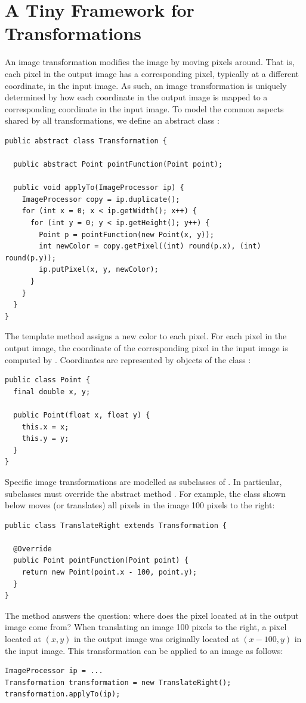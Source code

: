 \documentclass{book}
\begin{document}
\section{A Tiny Framework for Transformations}
An image transformation modifies the image by moving pixels around. That is, each pixel in the output image has a corresponding pixel, typically at a different coordinate, in the input image. As such, an image transformation is uniquely determined by how each coordinate in the output image is mapped to a corresponding coordinate in the input image. To model the common aspects shared by all transformations, we define an abstract class :
\begin{lstlisting}
public abstract class Transformation {

  public abstract Point pointFunction(Point point);

  public void applyTo(ImageProcessor ip) {
    ImageProcessor copy = ip.duplicate();
    for (int x = 0; x < ip.getWidth(); x++) {
      for (int y = 0; y < ip.getHeight(); y++) {
        Point p = pointFunction(new Point(x, y));
        int newColor = copy.getPixel((int) round(p.x), (int) round(p.y));
        ip.putPixel(x, y, newColor);
      }
    }
  }
}
\end{lstlisting}
The template method  assigns a new color to each pixel. For each pixel in the output image, the coordinate of the corresponding pixel in the input image is computed by . Coordinates are represented by objects of the class :
\begin{lstlisting}
public class Point {
  final double x, y;

  public Point(float x, float y) {
    this.x = x;
    this.y = y;
  }
}
\end{lstlisting}
Specific image transformations are modelled as subclasses of . In particular, subclasses must override the abstract method . For example, the class  shown below moves (or translates) all pixels in the image 100 pixels to the right:
\begin{lstlisting}
public class TranslateRight extends Transformation {

  @Override
  public Point pointFunction(Point point) {
    return new Point(point.x - 100, point.y);
  }
}
\end{lstlisting}
The method  answers the question: where does the pixel located at  in the output image come from? When translating an image 100 pixels to the right, a pixel located at $(x, y)$ in the output image was originally located at $(x - 100, y)$ in the input image. This transformation can be applied to an image as follows:
\begin{lstlisting}
ImageProcessor ip = ...
Transformation transformation = new TranslateRight();
transformation.applyTo(ip);
\end{lstlisting}
\end{document}
